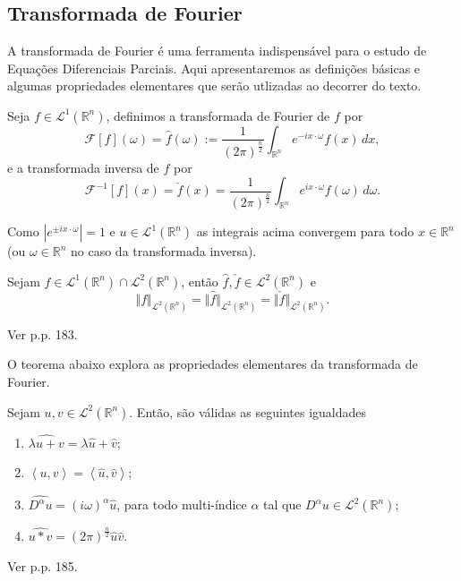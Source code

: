 \documentclass[a4paper, 11pt]{book}
\theoremstyle{definition}
\newcommand{\bR}{\mathbb{R}}
\newcommand{\cF}{\mathcal{F}}
\newcommand{\cL}{\mathcal{L}}
\begin{document}
\subsection{Transformada de Fourier}

A transformada de Fourier é uma ferramenta indispensável para o estudo de Equações Diferenciais Parciais. Aqui apresentaremos as definições básicas e algumas propriedades elementares que serão utlizadas ao decorrer do texto.

\begin{dbox}
    Seja $f \in \cL^1(\bR^n)$, definimos a transformada de Fourier de $f$ por
    \[
        \cF[f](\omega) = \hat f(\omega) := \frac{1}{(2\pi)^{\frac{n}{2}}} \int_{\bR^n} e^{-i x \cdot \omega} f(x) \,dx,
    \]
    e a transformada inversa de $f$ por
    \[
        \cF^{-1}[f](x) =  \check f(x) = \frac{1}{(2\pi)^{\frac{n}{2}}} \int_{\bR^n} e^{i x \cdot \omega} f(\omega) \,d\omega.
    \]
\end{dbox}

Como $|e^{\pm ix \cdot \omega}| = 1$ e $u \in \cL^1(\bR^n)$ as integrais acima convergem para todo $x \in \bR^n$ (ou $\omega \in \bR^n$ no caso da transformada inversa).

\begin{tbox} \label{thm:norma-transformada}
    Sejam $f \in \cL^1(\bR^n) \cap \cL^2(\bR^n)$, então $\hat f, \check f \in \cL^2(\bR^n)$ e
    \[
        \Vert f \Vert_{\cL^2(\bR^n)} = \Vert \hat f \Vert_{\cL^2(\bR^n)} = \Vert \check f \Vert_{\cL^2(\bR^n)}.
    \]
\end{tbox}
\begin{prf}
    Ver \cite{evans-pde} p.p. 183.
\end{prf}

O teorema abaixo explora as propriedades elementares da transformada de Fourier.

\begin{tbox} \label{thm:propriedades-transformada}
    Sejam $u, v \in \cL^2(\bR^n)$. Então, são válidas as seguintes igualdades
    \begin{enumerate}[leftmargin=*, label=\textbf{(\alph*)}]
        \item $\widehat{\lambda u + v} = \lambda \hat u + \hat v$;
        \item $\left\langle u, v\right\rangle = \left\langle \hat u, \hat v\right\rangle$;
        \item $\widehat{D^\alpha u} = (i\omega)^\alpha \hat u$, para todo multi-índice $\alpha$ tal que $D^\alpha u \in \cL^2(\bR^n);$\footnotemark
        \item $\widehat{u * v} = (2\pi)^{\frac{n}{2}} \hat u \hat v$.
    \end{enumerate}
\end{tbox}
\begin{prf}
    Ver \cite{evans-pde} p.p. 185.
\end{prf}
\end{document}
